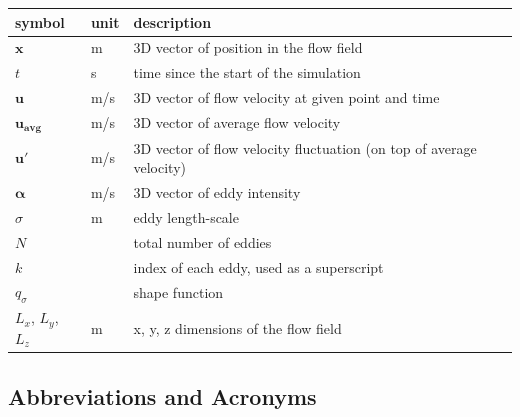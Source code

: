 \documentclass[12pt]{article}
\begin{document}
\renewcommand{\arraystretch}{1.2}
\noindent \begin{longtable*}{l l p{12cm}} \toprule
\textbf{symbol} & \textbf{unit} & \textbf{description}\\
\midrule 
$\mathbf{x}$ & \si{\metre} & 3D vector of position in the flow field
\\
$t$ & \si{\second} & time since the start of the simulation
\\
$\mathbf{u}$ & \si[per-mode=symbol] {\metre\per\second} & 3D vector of flow velocity at given point and time
\\
$\mathbf{u_{\text{avg}}}$ & \si[per-mode=symbol] {\metre\per\second} & 3D vector of average flow velocity
\\
$\mathbf{u'}$ & \si[per-mode=symbol] {\metre\per\second} & 3D vector of flow velocity fluctuation (on top of average velocity)
\\
$\boldsymbol{\alpha}$ & \si[per-mode=symbol] {\metre\per\second} & 3D vector of eddy intensity
\\
$\sigma$ & \si{\metre} & eddy length-scale
\\ 
$N$ &  & total number of eddies
\\ 
$k$ &  & index of each eddy, used as a superscript
\\
$q_\sigma$ &  & shape function
\\
$L_x$, $L_y$, $L_z$ & \si{\metre} & x, y, z dimensions of the flow field
\\
\bottomrule
\end{longtable*}

\subsection{Abbreviations and Acronyms}
\end{document}
